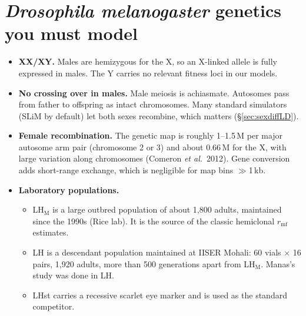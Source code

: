 \section{\emph{Drosophila melanogaster} genetics you must model}
\begin{itemize}
\item \textbf{XX/XY.} Males are hemizygous for the X, so an X-linked allele is fully expressed in males. The Y carries no relevant fitness loci in our models.
\item \textbf{No crossing over in males.} Male meiosis is achiasmate. Autosomes pass from father to offspring as intact chromosomes. Many standard simulators (SLiM by default) let both sexes recombine, which matters (\S\ref{sec:sexdiffLD}).
\item \textbf{Female recombination.} The genetic map is roughly 1--1.5\,M per major autosome arm pair (chromosome 2 or 3) and about 0.66\,M for the X, with large variation along chromosomes (Comeron \emph{et al.}\ 2012). Gene conversion adds short-range exchange, which is negligible for map bins $\gg$1\,kb.
\item \textbf{Laboratory populations.}
  \begin{itemize}
  \item LH$_\mathrm{M}$ is a large outbred population of about 1,800 adults, maintained since the 1990s (Rice lab). It is the source of the classic hemiclonal $r_{\mathrm{mf}}$ estimates.
  \item LH is a descendant population maintained at IISER Mohali: 60 vials $\times$ 16 pairs, 1,920 adults, more than 500 generations apart from LH$_\mathrm{M}$. Manas's study was done in LH.
  \item LHst carries a recessive scarlet eye marker and is used as the standard competitor.
  \end{itemize}
\end{itemize}

